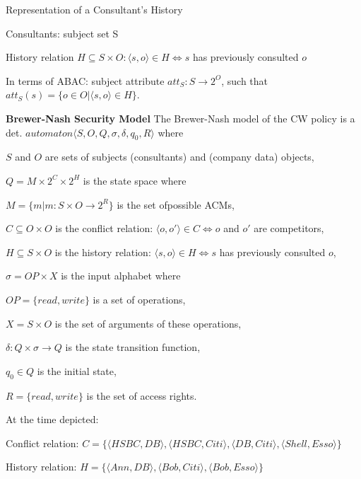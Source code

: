 \documentclass[a4paper]{article}
\renewcommand{\note}[2]{\begin{noteBox} \textbf{#1} #2 \end{noteBox}}
\begin{document}
\begin{multicols}{3}
    Representation of a Consultant’s History
    \begin{itemize*}
        \item Consultants: subject set S
        \item History relation $H\subseteq S\times O:⟨s,o⟩\in H\Leftrightarrow s$ has previously consulted $o$
        \item In terms of ABAC: subject attribute $att_S:S\rightarrow 2^O$, such that $att_S(s)=\{o\in O|⟨s,o⟩\in H\}$.
    \end{itemize*}

    \note{Brewer-Nash Security Model}{The Brewer-Nash model of the CW policy is a det. $automaton⟨S,O,Q,\sigma,\delta,q_0,R⟩$ where
        \begin{itemize*}
            \item $S$ and $O$ are sets of subjects (consultants) and (company data) objects,
            \item $Q=M\times 2^C\times 2^H$ is the state space where
            \begin{itemize*}
                \item $M=\{m|m:S\times O\rightarrow 2^R\}$ is the set ofpossible ACMs,
                \item $C\subseteq O\times O$ is the conflict relation: $⟨o,o'⟩\in C\Leftrightarrow o$ and $o'$ are competitors,
                \item $H\subseteq S\times O$ is the history relation: $⟨s,o⟩\in H\Leftrightarrow s$ has previously
                consulted $o$,
            \end{itemize*}
            \item $\sigma=OP \times X$ is the input alphabet where
            \begin{itemize*}
                \item $OP=\{read,write\}$ is a set of operations,
                \item $X=S \times O$ is the set of arguments of these operations,
            \end{itemize*}
            \item $\delta:Q \times\sigma\rightarrow Q$ is the state transition function,
            \item $q_0\in Q$ is the initial state,
            \item $R=\{read,write\}$ is the set of access rights.
        \end{itemize*}
    }

    At the time depicted:
    \begin{itemize*}
        \item Conflict relation: $C=\{⟨HSBC,DB⟩,⟨HSBC,Citi⟩,⟨DB,Citi⟩,⟨Shell,Esso⟩\}$
        \item History relation: $H=\{⟨Ann,DB⟩,⟨Bob,Citi⟩,⟨Bob,Esso⟩\}$
    \end{itemize*}



\end{multicols}
\end{document}
